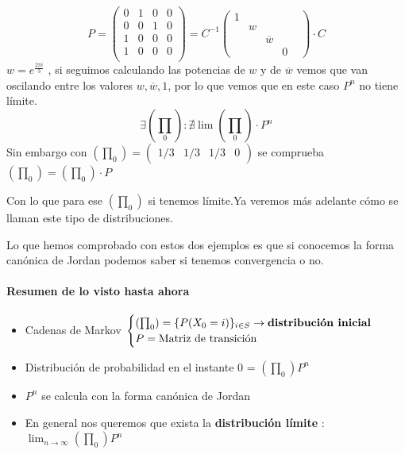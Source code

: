 \begin{example}[2]

	\begin{center}
		\centering
	\end{center}

	$$P = \left( \begin{matrix}
	0 & 1 & 0 & 0\\
	0 & 0 & 1 & 0\\
	1 & 0 & 0 & 0\\
	1 & 0 & 0 & 0\\
	\end{matrix}\right)= C^{-1} \left(\begin{matrix}
	1&&&&\\
	&w&&&\\
	&&\overline{w}&\\
	&&&0
	\end{matrix}
	\right)\cdot C$$
	$w = e^{\frac{2\pi i}{3}}$ , si seguimos calculando las potencias de $w$ y de $\overline{w}$ vemos que van oscilando entre los valores $w , \overline{w} , 1$, por lo que vemos que en este caso $P^n$ no tiene límite.
	$$\exists\left(\prod_0\right) : \nexists \lim \left(\prod_0\right)\cdot P^n$$
	Sin embargo con $(\prod_0) = (\begin{matrix}
	1/3&1/3&1/3&0
	\end{matrix}) $ se comprueba $(\prod_0) = (\prod_0)\cdot P$


	Con lo que para ese $(\prod_0)$ si tenemos límite.Ya veremos más adelante cómo se llaman este tipo de distribuciones.
\end{example}

Lo que hemos comprobado con estos dos ejemplos es que si conocemos la forma canónica de Jordan podemos saber si tenemos convergencia o no.

\paragraph{Resumen de lo visto hasta ahora}
\begin{itemize}
	\item Cadenas de Markov $\begin{cases}
	(\prod_0) = \{P(X_0 = i)\}_{i \in S} \rightarrow \text{\textbf{distribución inicial}}\\
	P = \text{Matriz de transición}
	\end{cases}$
	\item Distribución de probabilidad en el instante 0 = $(\prod_0)P^n$
	\item $P^n$ se calcula con la forma canónica de Jordan
	\item En general nos queremos que exista la \textbf{distribución límite} : $\lim_{n\rightarrow\infty} (\prod_0) P^n$
\end{itemize}

